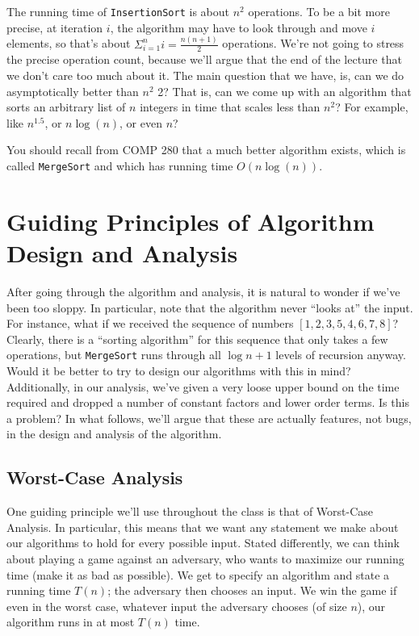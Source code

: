 \documentclass [12pt]{article}
\begin{document}
The running time of \texttt{InsertionSort} is about $n^2$ operations. To be a bit more precise, at iteration $i$, the algorithm may have to look through and move $i$ elements, so that’s about $\Sigma_{i=1}^n i = \frac{n(n+1)}{2}$ operations.
We’re not going to stress the precise operation count, because we’ll argue that the end of the lecture that we don’t care too much about it. The main question that we have, is, can we do asymptotically better than $n^2$
2? That is, can we come up with an algorithm that sorts an arbitrary list of $n$ integers in time that scales less than $n^2$? For example, like $n^{1.5}$, or $n \log(n)$, or even $n$?

You should recall from COMP 280 that a much better algorithm exists, which is called \texttt{MergeSort} and which has running time $O(n \log(n))$.

\section{Guiding Principles of Algorithm Design and Analysis}

After going through the algorithm and analysis, it is natural to wonder if we’ve been too sloppy. In particular, note that the algorithm never ``looks at'' the input. For instance, what if we received the sequence of numbers $[1, 2, 3, 5, 4, 6, 7, 8]$? Clearly, there is a ``sorting algorithm'' for this sequence that only takes a few operations, but \texttt{MergeSort} runs through all $\log n + 1$ levels of recursion anyway. Would it be better to try to design our algorithms with this in mind? Additionally, in our analysis, we’ve given a very loose upper bound on the time required and dropped a number of constant factors and lower order terms. Is this a problem? In what follows, we’ll argue that these are actually features, not bugs, in the design and analysis of the algorithm.


\subsection{Worst-Case Analysis}

One guiding principle we’ll use throughout the class is that of Worst-Case Analysis. In particular, this means that we want any statement we make about our algorithms to hold for every possible input. Stated differently, we can think about playing a game against an adversary, who wants to maximize our running time (make it as bad as possible). We get to specify an algorithm and state a running time $T(n)$; the adversary then chooses an input. We win the game if even in the worst case, whatever input the adversary chooses (of size $n$), our algorithm runs in at most $T(n)$ time.
\end{document}
